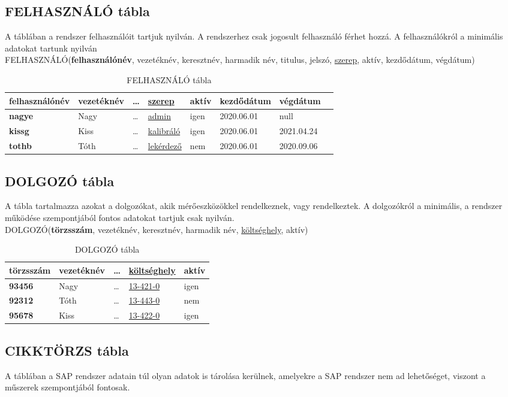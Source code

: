 \documentclass[a4paper,12pt]{report}
\newcommand{\PK}[1]{\textbf{#1}}
\newcommand{\FK}[1]{\underline{#1}}
\newcommand{\TABLA}[1]{\noindent\MakeUppercase{#1}}
\begin{document}
\subsection{FELHASZNÁLÓ tábla}
A táblában a rendszer felhasználóit tartjuk nyilván. A rendszerhez csak 
jogosult felhasználó férhet hozzá. A felhasználókról a minimális adatokat 
tartunk nyilván\\

\TABLA{felhasználó}(\PK{felhasználónév}, vezetéknév, keresztnév, 
harmadik név, titulus, jelszó, \FK{szerep}, aktív, kezdődátum, végdátum)

\begin{table}[ht!]
 \centering
 \begin{tabular}[t]{|l|l|l|l|l|l|l|l|}
  \hline
  
\textbf{felhasználónév}&vezetéknév&\dots&\FK{szerep}
&aktív&kezdődátum&végdátum\\ \hline
  \textbf{nagye}&Nagy&\dots&\FK{admin}&igen&2020.06.01&null \\
  \textbf{kissg}&Kiss&\dots&\FK{kalibráló}&igen&2020.06.01&2021.04.24\\
  \textbf{tothb}&Tóth&\dots&\FK{lekérdező}&nem&2020.06.01&2020.09.06\\
 \end{tabular}
\caption{FELHASZNÁLÓ tábla}\label{tabFEHASZNALO}
\end{table}

\subsection{DOLGOZÓ tábla}
A tábla tartalmazza azokat a dolgozókat, akik mérőeszközökkel 
rendelkeznek, vagy rendelkeztek. A dolgozókról a minimális, a rendszer 
működése szempontjából fontos adatokat tartjuk csak nyilván.\\

\TABLA{dolgozó}(\PK{törzsszám}, vezetéknév, keresztnév, harmadik név, 
\FK{költséghely}, aktív)

\begin{table}[ht!]
 \centering
 \begin{tabular}[t]{|l|l|l|l|l|}
  \hline
\textbf{törzsszám}&vezetéknév&\dots&\FK{költséghely}&aktív\\ 
\hline
  \textbf{93456}&Nagy&\dots&\FK{13-421-0}&igen \\
  \textbf{92312}&Tóth&\dots&\FK{13-443-0}&nem \\
  \textbf{95678}&Kiss&\dots&\FK{13-422-0}&igen\\
 \end{tabular}
\caption{DOLGOZÓ tábla}\label{tabDOLGOZO}
\end{table}

\subsection{CIKKTÖRZS tábla}
A táblában a SAP rendszer adatain túl olyan adatok is tárolása kerülnek, 
amelyekre a SAP rendszer nem ad lehetőséget, viszont a műszerek
szempontjából fontosak.






%
% 
\end{document}
